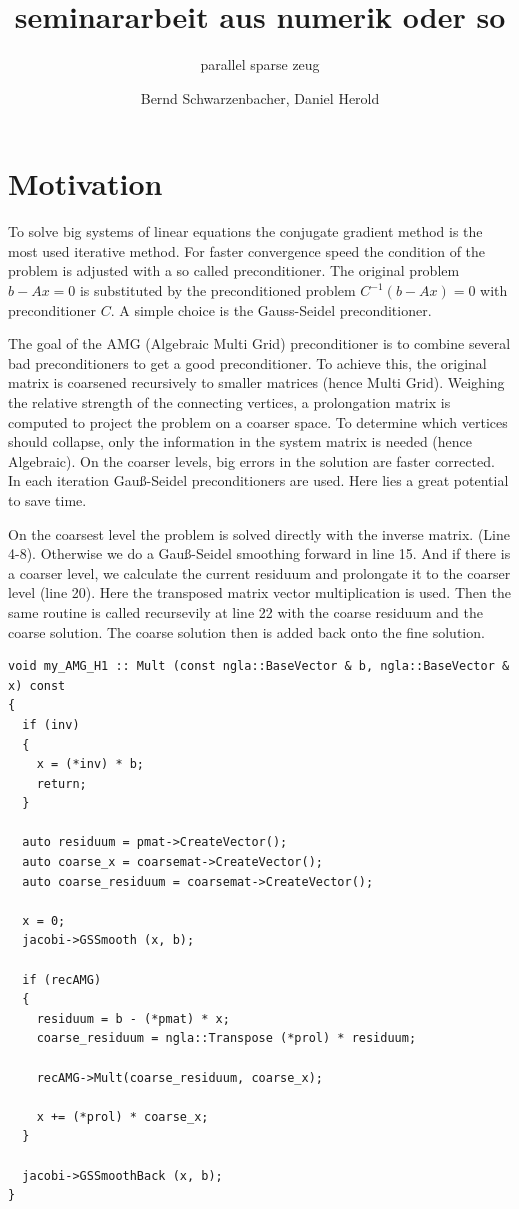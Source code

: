 \documentclass[a4paper,11pt]{scrartcl}
\title{seminararbeit aus numerik oder so}
\subtitle{parallel sparse zeug}
\author{Bernd Schwarzenbacher, Daniel Herold}
\begin{document}
\maketitle
\tableofcontents

\pagebreak

\section{Motivation}

To solve big systems of linear equations the conjugate gradient method is the
most used iterative method.
For faster convergence speed the condition of the problem is
adjusted with a so called preconditioner.
The original problem $b-Ax=0$ is substituted by the preconditioned problem
$C^{-1} (b-Ax) = 0$ with preconditioner $C$.
A simple choice is the Gauss-Seidel preconditioner.

The goal of the AMG (Algebraic Multi Grid) preconditioner is to combine several
bad preconditioners to get a good preconditioner. To achieve this, the original
matrix is coarsened recursively to smaller matrices (hence Multi Grid).
Weighing the relative strength of the connecting vertices, a prolongation matrix
is computed to project the problem on a coarser space. To determine which
vertices should collapse, only the information in the system matrix is needed
(hence Algebraic).
On the coarser levels, big errors in the solution are faster corrected.
In each iteration Gauß-Seidel preconditioners are used.
Here lies a great potential to save time.

On the coarsest level the problem is solved directly with the inverse matrix.
(Line 4-8).
Otherwise we do a Gauß-Seidel smoothing forward in line 15.
And if there is a coarser level, we calculate the current residuum and
prolongate it to the coarser level (line 20). Here the transposed
matrix vector multiplication is used. Then the same routine is called
recursevily at line 22 with the coarse residuum and the coarse solution. The
coarse solution then is added back onto the fine solution.

\begin{lstlisting}
void my_AMG_H1 :: Mult (const ngla::BaseVector & b, ngla::BaseVector & x) const
{
  if (inv)
  {
    x = (*inv) * b;
    return;
  }

  auto residuum = pmat->CreateVector();
  auto coarse_x = coarsemat->CreateVector();
  auto coarse_residuum = coarsemat->CreateVector();

  x = 0;
  jacobi->GSSmooth (x, b);

  if (recAMG)
  {
    residuum = b - (*pmat) * x;
    coarse_residuum = ngla::Transpose (*prol) * residuum;

    recAMG->Mult(coarse_residuum, coarse_x);

    x += (*prol) * coarse_x;
  }

  jacobi->GSSmoothBack (x, b);
}
\end{lstlisting}
\end{document}
